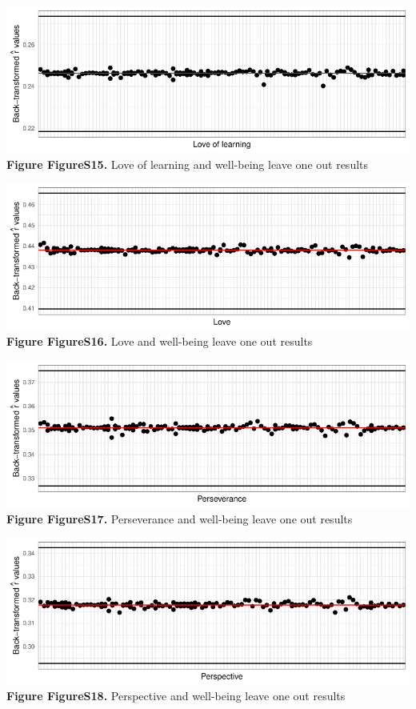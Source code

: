 \documentclass[
  letterpaper,
  DIV=11,
  numbers=noendperiod]{scrartcl}
\begin{document}
\includegraphics{SupplementaryResults_files/figure-pdf/unnamed-chunk-11-15.pdf}\textbf{Figure
FigureS15.} Love of learning and well-being leave one out results

\includegraphics{SupplementaryResults_files/figure-pdf/unnamed-chunk-11-16.pdf}\textbf{Figure
FigureS16.} Love and well-being leave one out results

\includegraphics{SupplementaryResults_files/figure-pdf/unnamed-chunk-11-17.pdf}\textbf{Figure
FigureS17.} Perseverance and well-being leave one out results

\includegraphics{SupplementaryResults_files/figure-pdf/unnamed-chunk-11-18.pdf}\textbf{Figure
FigureS18.} Perspective and well-being leave one out results
\end{document}
